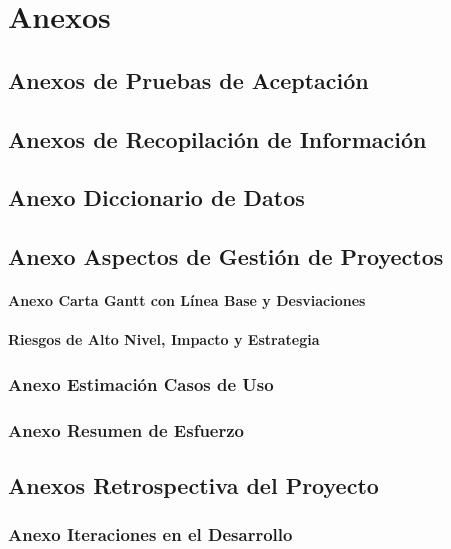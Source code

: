 \chapter{Anexos}

\section{Anexos de Pruebas de Aceptación}

\section{Anexos de Recopilación de Información}

\section{Anexo Diccionario de Datos}

\section{Anexo Aspectos de Gestión de Proyectos}

\subsubsection{Anexo Carta Gantt con Línea Base y Desviaciones}

\subsubsection{Riesgos de Alto Nivel, Impacto y Estrategia}
	
\subsection{Anexo Estimación Casos de Uso}


\subsection{Anexo Resumen de Esfuerzo}
 

\section{Anexos Retrospectiva del Proyecto}

\subsection{Anexo Iteraciones en el Desarrollo}
